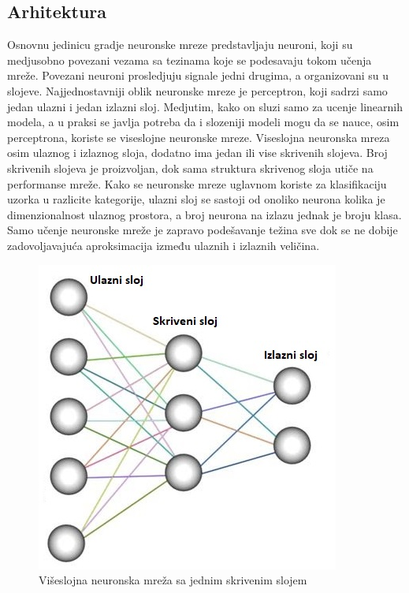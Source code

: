 \documentclass[a4paper]{article}
\begin{document}
\subsection{Arhitektura}

Osnovnu jedinicu gradje neuronske mreze predstavljaju neuroni, koji su medjusobno povezani vezama sa tezinama koje se podesavaju tokom učenja mreže. Povezani neuroni prosledjuju signale jedni drugima, a organizovani su u slojeve. Najjednostavniji oblik neuronske mreze je perceptron, koji sadrzi samo jedan ulazni i jedan izlazni sloj. Medjutim, kako on sluzi samo za ucenje linearnih modela, a u praksi se javlja potreba da i slozeniji modeli mogu da se nauce, osim perceptrona, koriste se viseslojne neuronske mreze. Viseslojna neuronska mreza osim ulaznog i izlaznog sloja, dodatno ima jedan ili vise skrivenih slojeva. Broj skrivenih slojeva je proizvoljan, dok sama struktura skrivenog sloja utiče na performanse mreže. Kako se neuronske mreze uglavnom koriste za klasifikaciju uzorka u razlicite kategorije, ulazni sloj se sastoji od onoliko neurona kolika je dimenzionalnost ulaznog prostora, a broj neurona na izlazu jednak je broju klasa. Samo učenje neuronske mreže je zapravo podešavanje težina sve dok se ne dobije zadovoljavajuća aproksimacija između ulaznih i izlaznih veličina.


\begin{figure}[h!]
\begin{center}
\includegraphics[scale=1]{neural_network_layers.jpeg}
\end{center}
\caption{Višeslojna neuronska mreža sa jednim skrivenim slojem}
\label{fig:neural_network_layers}
\end{figure}
\end{document}
